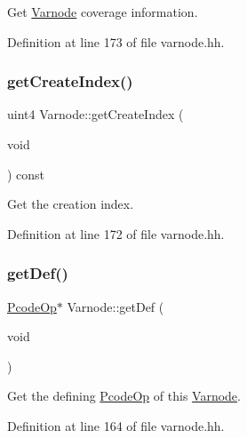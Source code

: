 Get \mbox{\hyperlink{class_varnode}{Varnode}} coverage information. 



Definition at line 173 of file varnode.\+hh.

\mbox{\label{class_varnode_a992373a5e7140d1af736526c0ecfa548}} 
\subsubsection{\texorpdfstring{getCreateIndex()}{getCreateIndex()}}
{\footnotesize\ttfamily uint4 Varnode\+::get\+Create\+Index (\begin{DoxyParamCaption}\item[{void}]{ }\end{DoxyParamCaption}) const\hspace{0.3cm}{\ttfamily [inline]}}



Get the creation index. 



Definition at line 172 of file varnode.\+hh.

\mbox{\label{class_varnode_a8f227a762a3baec9ffa6962c5298e3a3}} 
\subsubsection{\texorpdfstring{getDef()}{getDef()}\hspace{0.1cm}{\footnotesize\ttfamily [1/2]}}
{\footnotesize\ttfamily \mbox{\hyperlink{class_pcode_op}{Pcode\+Op}}$\ast$ Varnode\+::get\+Def (\begin{DoxyParamCaption}\item[{void}]{ }\end{DoxyParamCaption})\hspace{0.3cm}{\ttfamily [inline]}}



Get the defining \mbox{\hyperlink{class_pcode_op}{Pcode\+Op}} of this \mbox{\hyperlink{class_varnode}{Varnode}}. 



Definition at line 164 of file varnode.\+hh.

\mbox{\label{class_varnode_ae84dc23e1dd22fde882aca43d22ec681}} 
